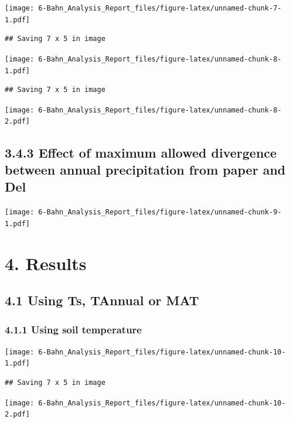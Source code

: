\documentclass[]{article}
\begin{document}
\texttt{[image: 6-Bahn\_Analysis\_Report\_files/figure-latex/unnamed-chunk-7-1.pdf]}

\begin{verbatim}
## Saving 7 x 5 in image
\end{verbatim}

\texttt{[image: 6-Bahn\_Analysis\_Report\_files/figure-latex/unnamed-chunk-8-1.pdf]}

\begin{verbatim}
## Saving 7 x 5 in image
\end{verbatim}

\texttt{[image: 6-Bahn\_Analysis\_Report\_files/figure-latex/unnamed-chunk-8-2.pdf]}

\hypertarget{effect-of-maximum-allowed-divergence-between-annual-precipitation-from-paper-and-del}{%
\subsection{3.4.3 Effect of maximum allowed divergence between annual
precipitation from paper and
Del}\label{effect-of-maximum-allowed-divergence-between-annual-precipitation-from-paper-and-del}}

\texttt{[image: 6-Bahn\_Analysis\_Report\_files/figure-latex/unnamed-chunk-9-1.pdf]}

\hypertarget{results}{%
\section{4. Results}\label{results}}

\hypertarget{using-ts-tannual-or-mat}{%
\subsection{4.1 Using Ts, TAnnual or
MAT}\label{using-ts-tannual-or-mat}}

\hypertarget{using-soil-temperature}{%
\subsubsection{4.1.1 Using soil
temperature}\label{using-soil-temperature}}

\texttt{[image: 6-Bahn\_Analysis\_Report\_files/figure-latex/unnamed-chunk-10-1.pdf]}

\begin{verbatim}
## Saving 7 x 5 in image
\end{verbatim}

\texttt{[image: 6-Bahn\_Analysis\_Report\_files/figure-latex/unnamed-chunk-10-2.pdf]}
\end{document}
